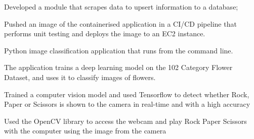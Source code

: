 \documentclass[]{plushcv}
\begin{document}
\begin{minipage}[t]{0.70\textwidth}
\begin{tightemize}
\item Developed a module that scrapes data to upsert information to a database;
\item Pushed an image of the containerised application in a CI/CD pipeline that performs unit testing and deploys the image to an EC2 instance.
\end{tightemize}
\sectionsep


\begin{tightemize}
\item Python image classification application that runs from the command line. 
\item The application trains a deep learning model on the 102 Category Flower Dataset, and uses it to classify images of flowers.
\end{tightemize}
\sectionsep

\begin{tightemize}
\item Trained a computer vision model and used Tensorflow to detect whether Rock, Paper or Scissors is shown to the camera in real-time and with a high accuracy
\item Used the OpenCV library to access the webcam and play Rock Paper Scissors with the computer using the image from the camera
\end{tightemize}
\sectionsep



\end{minipage}
\end{document}
